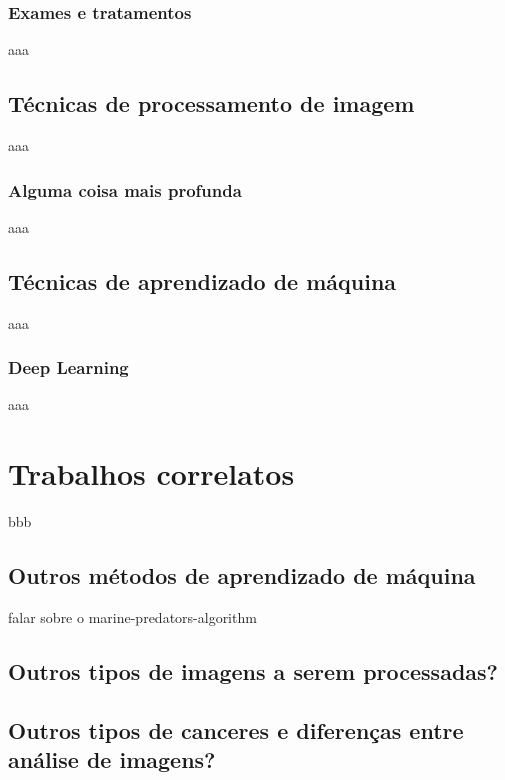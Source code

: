 \subsubsection{Exames e tratamentos}
aaa
\subsection{Técnicas de processamento de imagem}
aaa
\subsubsection{Alguma coisa mais profunda}
aaa
\subsection{Técnicas de aprendizado de máquina}
aaa
\subsubsection{Deep Learning}
aaa





\section{\esp Trabalhos correlatos} %
bbb
\subsection{Outros métodos de aprendizado de máquina}
falar sobre o marine-predators-algorithm
\subsection{Outros tipos de imagens a serem processadas?}
\subsection{Outros tipos de canceres e diferenças entre análise de imagens?}



